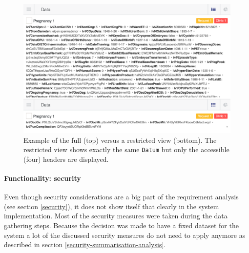 
\begin{figure}[ht]
	\centering
	\includegraphics[width=1.0\linewidth]{images/datasets-example}
	\caption{
		Example of the full \projectdata{} (top) versus a restricted view (bottom).
		The restricted view shows exactly the same {\tt Datum} but only the accessible (four) headers are displayed.
	}
	\label{fig:dataset-example}
\end{figure}

\paragraph{Functionality: security}
Even though security considerations are a big part of the requirement analysis (see section \ref{security}), it does not show itself that clearly in the system implementation.
Most of the security measures were taken during the data gathering steps.
Because the decision was made to have a fixed dataset for the system a lot of the discussed security measures do not need to apply anymore as described in section \ref{security-summarisation-analysis}.

